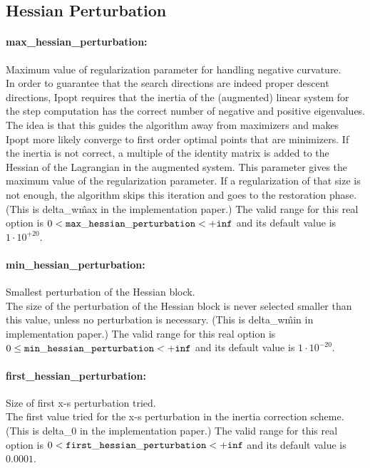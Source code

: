 \subsection{Hessian Perturbation}

\paragraph{max\_hessian\_perturbation:}\label{opt:max_hessian_perturbation} Maximum value of regularization parameter for handling negative curvature. \\
 In order to guarantee that the search directions are indeed proper descent directions, Ipopt requires that the inertia of the (augmented) linear system for the step computation has the correct number of negative and positive eigenvalues. The idea is that this guides the algorithm away from maximizers and makes Ipopt more likely converge to first order optimal points that are minimizers. If the inertia is not correct, a multiple of the identity matrix is added to the Hessian of the Lagrangian in the augmented system. This parameter gives the maximum value of the regularization parameter. If a regularization of that size is not enough, the algorithm skips this iteration and goes to the restoration phase. (This is delta\_w\^max in the implementation paper.) The valid range for this real option is 
$0 <  {\tt max\_hessian\_perturbation } <  {\tt +inf}$
and its default value is $1 \cdot 10^{+20}$.


\paragraph{min\_hessian\_perturbation:}\label{opt:min_hessian_perturbation} Smallest perturbation of the Hessian block. \\
 The size of the perturbation of the Hessian block is never selected smaller than this value, unless no perturbation is necessary. (This is delta\_w\^min in implementation paper.) The valid range for this real option is 
$0 \le {\tt min\_hessian\_perturbation } <  {\tt +inf}$
and its default value is $1 \cdot 10^{-20}$.


\paragraph{first\_hessian\_perturbation:}\label{opt:first_hessian_perturbation} Size of first x-s perturbation tried. \\
 The first value tried for the x-s perturbation in the inertia correction scheme.(This is delta\_0 in the implementation paper.) The valid range for this real option is 
$0 <  {\tt first\_hessian\_perturbation } <  {\tt +inf}$
and its default value is $0.0001$.


